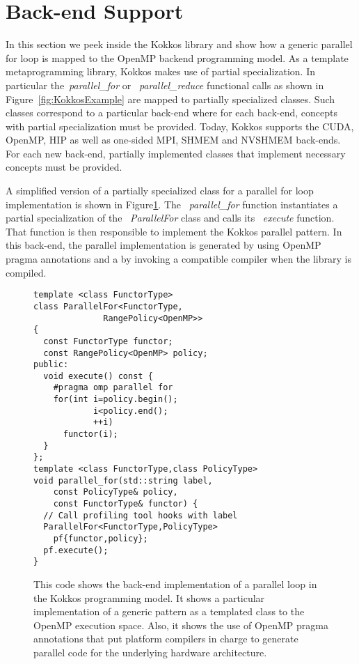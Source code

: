 
\section{Back-end Support}\label{chap:backend}

In this section we peek inside the Kokkos library and show how a generic parallel for loop is mapped to the OpenMP backend programming model. As a template metaprogramming library, Kokkos makes use of partial specialization. In particular the~\emph{parallel\_for} or ~\emph{parallel\_reduce} functional calls as shown in Figure~\ref{fig:KokkosExample} are mapped to partially specialized classes. Such classes correspond to a particular back-end where for each back-end, concepts with partial specialization must be provided. Today, Kokkos supports the CUDA, OpenMP, HIP as well as one-sided MPI, SHMEM and NVSHMEM back-ends. For each new back-end, partially implemented classes that implement necessary concepts must be provided.

A simplified version of a partially specialized class for a parallel for loop implementation is shown in Figure\ref{fig:KokkosExampleOMPBackEnd}. The ~\emph{parallel\_for} function instantiates a partial specialization of the ~\emph{ParallelFor} class and calls its ~\emph{execute} function. That function is then responsible to implement the Kokkos parallel pattern. In this back-end, the parallel implementation is generated by using OpenMP pragma annotations and a by invoking a compatible compiler when the library is compiled. 
\begin{figure}
\begin{small}
\begin{verbatim}
template <class FunctorType>
class ParallelFor<FunctorType,
              RangePolicy<OpenMP>> 
{
  const FunctorType functor;
  const RangePolicy<OpenMP> policy; 
public:
  void execute() const {
    #pragma omp parallel for
    for(int i=policy.begin();
            i<policy.end();
            ++i)
      functor(i);
  }
};
template <class FunctorType,class PolicyType>
void parallel_for(std::string label, 
    const PolicyType& policy,
    const FunctorType& functor) {
  // Call profiling tool hooks with label
  ParallelFor<FunctorType,PolicyType> 
    pf{functor,policy};
  pf.execute();
}
\end{verbatim}
\end{small}
\caption{This code shows the back-end implementation of a parallel loop in the Kokkos programming model. It shows a particular implementation of a generic pattern as a templated class to the OpenMP execution space. Also, it shows the use of OpenMP pragma annotations that put platform compilers in charge to generate parallel code for the underlying hardware architecture.}
\label{fig:KokkosExampleOMPBackEnd}
\end{figure}

